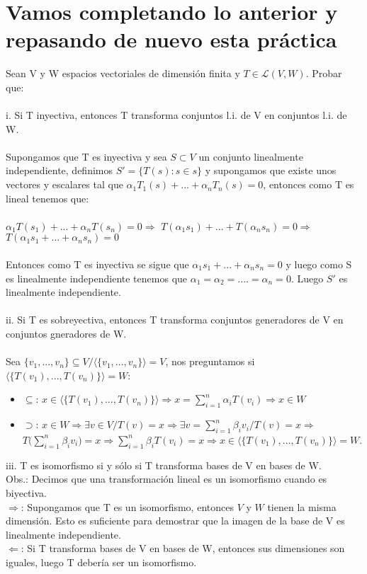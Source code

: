 \documentclass{article}
\begin{document}
\section{Vamos completando lo anterior y repasando de nuevo esta práctica}
Sean V y W espacios vectoriales de dimensión finita y $T \in \mathcal{L}(V,W)$. Probar que: \\ \\
i. Si T inyectiva, entonces T transforma conjuntos l.i. de V en conjuntos l.i. de W. \\
\\
Supongamos que T es inyectiva y sea $S \subset V$ un conjunto linealmente independiente, definimos
$S' = \{ T(s) : s \in s \}$ y supongamos que existe unos vectores y escalares tal que
$\alpha_1T_1(s)+...+\alpha_nT_n(s)=0$, entonces como T es lineal tenemos que:
\\
\\
$\alpha_1T(s_1)+...+\alpha_nT(s_n) = 0 \Rightarrow$ 
$T(\alpha_1s_1)+...+T(\alpha_ns_n) = 0 \Rightarrow$
$T(\alpha_1s_1+...+\alpha_ns_n) = 0$
\\
\\ Entonces como T es inyectiva se sigue que $\alpha_1s_1+...+\alpha_ns_n = 0$ y luego como S es
linealmente independiente tenemos que $\alpha_1=\alpha_2=....=\alpha_n=0$. Luego $S'$ es linealmente
independiente.
\\ \\
ii. Si T es sobreyectiva, entonces T transforma conjuntos generadores de V en conjuntos gneradores de W.
\\ \\
Sea $\lbrace v_1,...,v_n \rbrace \subseteq V / \langle \{ v_1,...,v_n  \}  \rangle = V$, nos preguntamos
si $\langle \{ T(v_1),...,T(v_n) \} \rangle = W$:

\begin{itemize}	
\item
	$\subseteq$: $x \in \langle \{ T(v_1),...,T(v_n)  \}\rangle \Rightarrow
	\displaystyle x = \sum_{i=1}^{n}{\alpha_iT(v_i)} \Rightarrow x \in W$
\item
	$\supset$: $x \in W \Rightarrow \exists v \in V / T(v) = x \Rightarrow \exists v =
	\displaystyle \sum_{i=1}^{n}{\beta_i v_i} / T(v) = x \Rightarrow$ \\
	$\displaystyle T\Big( \sum_{i=1}^{n}{\beta_i v_i} \Big) =x \Rightarrow 
	\sum_{i=1}^{n}{\beta_iT(v_i)} = x \Rightarrow x \in \langle \{ T(v_1),...,T(v_n) \} \rangle
	= W$.
\end{itemize}
iii. T es isomorfismo si y sólo si T transforma bases de V en bases de W.
\\
Obs.: Decimos que una transformación lineal es un isomorfismo cuando es biyectiva. \\
$\Rightarrow$: Supongamos que T es un isomorfismo, entonces $V$ y $W$ tienen la misma dimensión.
Esto es suficiente para demostrar que la imagen de la base de V es linealmente independiente. \\
$\Leftarrow$: Si T transforma bases de V en bases de W, entonces sus dimensiones son iguales,
luego T debería ser un isomorfismo.
\end{document}

